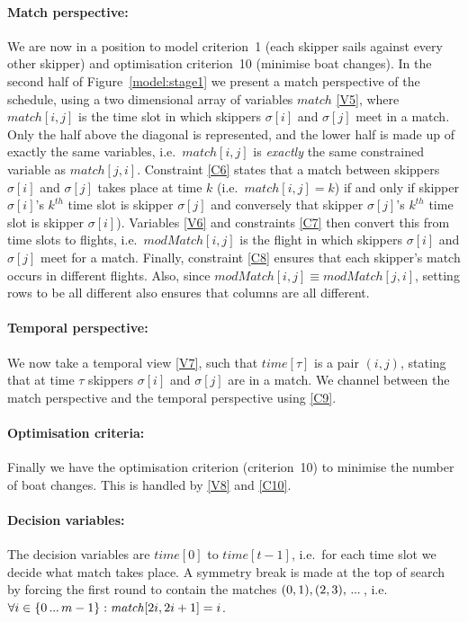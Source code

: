 \documentclass{llncs}
\newcommand{\match}{\mathit{match}}
\newcommand{\modMatch}{\mathit{modMatch}}
\newcommand{\timeVar}{\mathit{time}}
\newcommand\nldots{\,\hbox to 0.8em{.\hss.\hss.}\,}
\begin{document}
\paragraph{Match perspective:} We are now in a position to model criterion~1 (each skipper sails
against every other skipper) and optimisation criterion~10 (minimise boat changes).  In the second
half of Figure~\ref{model:stage1} we present a match perspective of the schedule, using a two
dimensional array of variables $\match$ \eqref{V5}, where $\match[{i,j}]$ is the time slot in which
skippers $\sigma[{i}]$ and $\sigma[{j}]$ meet in a match. Only the half above the diagonal is
represented, and the lower half is made up of exactly the same variables, i.e.\ $\match[{i,j}]$ is
\emph{exactly} the same constrained variable as $\match[{j,i}]$. Constraint \eqref{C6} states that
a match between skippers $\sigma[{i}]$ and $\sigma[{j}]$ takes place at time $k$ (i.e.\
$\match[{i,j}] = k$) if and only if  skipper $\sigma[{i}]$'s $k^{th}$ time slot is skipper
$\sigma[{j}]$ and conversely that skipper $\sigma[{j}]$'s $k^{th}$ time slot is skipper
$\sigma[{i}]$). Variables \eqref{V6} and constraints \eqref{C7} then convert this from time slots to
flights, i.e.\ $\modMatch[{i,j}]$ is the flight in which skippers $\sigma[{i}]$ and $\sigma[{j}]$
meet for a match. Finally, constraint \eqref{C8} ensures that each skipper's match occurs in
different flights. Also, since $\modMatch[{i,j}] \equiv \modMatch[{j,i}]$, setting rows to be all
different also ensures that columns are all different.

\paragraph{Temporal perspective:} We now take a temporal view \eqref{V7}, such that
$\timeVar[{\tau}]$ is a pair $(i,j)$, stating that at time $\tau$ skippers $\sigma[{i}]$ and
$\sigma[{j}]$ are in a match. We channel between the match perspective and the temporal perspective
using \eqref{C9}.

\paragraph{Optimisation criteria:} Finally we have the optimisation criterion (criterion~10) to
minimise the number of boat changes. This is handled by \eqref{V8} and \eqref{C10}.

\paragraph{Decision variables:} The decision variables are $\timeVar[{0}]$ to $\timeVar[{t-1}]$,
i.e.\ for each time slot we decide what match takes place. A symmetry break is made at the top of
search by forcing the first round to contain the matches $(0,1), (2,3), \nldots$, i.e.\ $\forall i
\in \{0 \nldots {m-1}\} : \match[{2i, 2i+1}] = i$.
\end{document}
